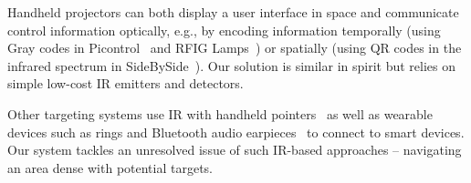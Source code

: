 Handheld projectors can both display a user interface in space and communicate control information optically, e.g., by encoding information temporally (using Gray codes in Picontrol~\cite{schmidt_picontrol:_2012} and RFIG Lamps~\cite{raskar_rfig_2004}) or spatially (using QR codes in the infrared spectrum in SideBySide~\cite{willis_sidebyside:_2011}). Our solution is similar in spirit but relies on simple low-cost IR emitters and detectors. 

Other targeting systems use IR with handheld pointers~\cite{swindells_that_2002} as well as wearable devices such as rings and Bluetooth audio earpieces~\cite{merrill_augmenting_2007} to connect to smart devices. Our system tackles an unresolved issue of such IR-based approaches -- navigating an area dense with potential targets.

